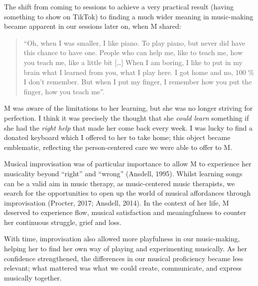 \documentclass[authordate, empirical, issue]{jote-new-article}
\begin{document}
The shift from coming to sessions to achieve a very practical result (having something to show on TikTok) to finding a much wider meaning in music-making became apparent in our sessions later on, when M shared:







\begin{quote}
  “Oh, when I was smaller, I like piano. To play piano, but never did have this chance to have one. People who can help me, like to teach me, how you teach me, like a little bit […] When I am boring, I like to put in my brain what I learned from you, what I play here. I got home and no, 100 \% I don't remember. But when I put my finger, I remember how you put the finger, how you teach me”.
\end{quote}







M was aware of the limitations to her learning, but she was no longer striving for perfection. I think it was precisely the thought that she \emph{could learn }something if she had the \emph{right help} that made her come back every week. I was lucky to find a donated keyboard which I offered to her to take home; this object became emblematic, reflecting the person-centered care we were able to offer to M.







Musical improvisation was of particular importance to allow M to experience her musicality beyond “right” and “wrong” (Ansdell, 1995). Whilst learning songs can be a valid aim in music therapy, as music-centered music therapists, we search for the opportunities to open up the world of musical affordances through improvisation (Procter, 2017; Ansdell, 2014). In the context of her life, M deserved to experience flow, musical satisfaction and meaningfulness to counter her continuous struggle, grief and loss.







With time, improvisation also allowed more playfulness in our music-making, helping her to find her own way of playing and experimenting musically. As her confidence strengthened, the differences in our musical proficiency became less relevant; what mattered was what we could create, communicate, and express musically together.
\end{document}
